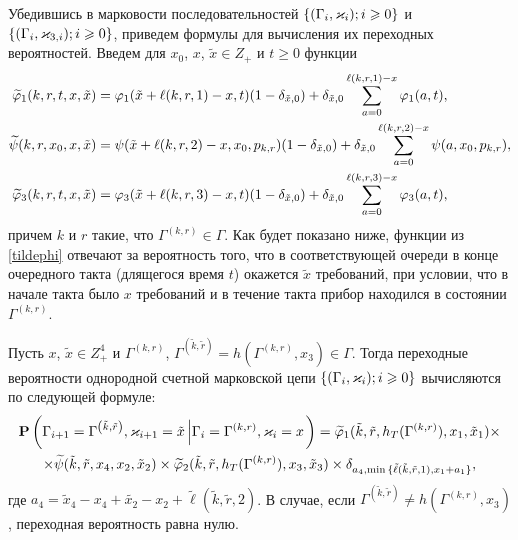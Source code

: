 \documentclass[a4paper,12pt,russian]{extarticle}
\newcommand{\G}{\Gamma}
\newcommand{\Mark}{\{(\G_i, \vk_i); i \geqslant 0\}}
\newcommand{\MarkThree}{\{(\G_i, \vk_{3,i}); i \geqslant 0\}}
\newcommand{\ga}[1]{\Gamma^{\left( #1 \right)} }
\renewcommand{\Pr}{{\mathbf P}}
\renewcommand{\P}[2]{\Pr\left( #1 \left| #2\right.\right)}
\begin{document}
Убедившись в марковости последовательностей $\Mark$ и $\MarkThree$, приведем формулы для вычисления их переходных вероятностей. Введем для $x_0$, $x$, $\tilde{x} \in Z_+$ и $t\geqslant 0$ функции
\begin{equation}
\begin{aligned}
\widetilde{\varphi}_1(k,r,t,x,\tilde{x}) &= \varphi_1(\tilde{x} + \ell(k,r,1)-x,t) (1 - \delta_{\tilde{x},0}) +\delta_{\tilde{x},0}\sum_{a=0}^{\ell(k,r,1)-x} \varphi_1(a,t),\\
\widetilde{\psi}(k,r,x_0,x,\tilde{x}) &= \psi(\tilde{x}+\ell(k,r,2)-x,x_0, p_{k,r}) (1 - \delta_{\tilde{x},0}) + \delta_{\tilde{x},0}\sum_{a=0}^{\ell(k,r,2)-x} \psi(a,x_0, p_{k,r}),\\
\widetilde{\varphi}_3(k,r,t,x,\tilde{x}) &= \varphi_3(\tilde{x} + \ell(k,r,3)-x,t) (1-\delta_{\tilde{x},0}) +\delta_{\tilde{x},0}\sum_{a=0}^{\ell(k,r,3)-x} \varphi_3(a,t),
\end{aligned}
\label{tildephi}
\end{equation}
причем $k$ и $r$ такие, что $\ga{k,r}\in \G$.
Как будет показано ниже, функции из \eqref{tildephi} отвечают за вероятность того, что в соответствующей очереди в конце очередного такта (длящегося время $t$) окажется $\tilde{x}$ требований, при условии, что в начале такта было $x$ требований и в течение такта прибор находился в состоянии $\ga{k,r}$.
\begin{theorem}
Пусть $x$, $\tilde{x}\in Z_+^4$ и $\ga{k,r}$, $\ga{\tilde{k},\tilde{r}}=h(\ga{k,r},x_3) \in \G$. Тогда переходные вероятности однородной счетной марковской цепи $\Mark$ вычисляются по следующей формуле:
\begin{multline}
\P{\G_{i+1}=\ga{\tilde{k},\tilde{r}},\vk_{i+1}=\tilde{x}}{\G_{i}=\ga{k,r},\vk_i=x} 
=\widetilde{\vp}_1(\tilde{k},\tilde{r},h_T(\ga{{k},{r}}),x_1,\tilde{x}_1) \times  \\ 
\times
\widetilde{\psi}(\tilde{k},\tilde{r},x_4,x_2, \tilde{x}_2) 
\times
\widetilde{\vp}_2(\tilde{k},\tilde{r},h_T(\ga{{k},{r}}),x_3,\tilde{x}_3)
\times \delta_{a_4,\min{\{\tilde{\ell}(\tilde{k},\tilde{r},1), x_1+a_1}\}},
\label{transitionToProve}
\end{multline}
где $a_4=\tilde{x}_4-x_4+\tilde{x_2}-x_2+\tilde{\ell}(\tilde{k},\tilde{r},2)$. В случае, если $\ga{\tilde{k},\tilde{r}}\neq h(\ga{k,r},x_3)$, переходная вероятность равна нулю.
\end{theorem}
\end{document}
